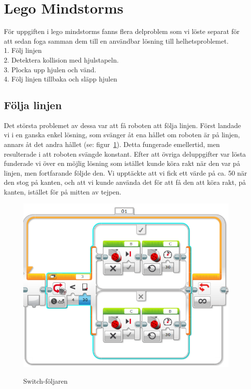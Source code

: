 \documentclass[12pt,a4paper]{article}
\begin{document}
\section{Lego Mindstorms}
För uppgiften i lego mindstorms fanns flera delproblem som vi löste separat för att sedan foga samman dem till en användbar lösning till helhetsproblemet. \\
1. Följ linjen \\
2. Detektera kollision med hjulstapeln. \\
3. Plocka upp hjulen och vänd. \\
4. Följ linjen tillbaka och släpp hjulen \\
\subsection{Följa linjen}
Det största problemet av dessa var att få roboten att följa linjen. Först landade vi i en ganska enkel lösning, som svänger åt ena hållet om roboten är på linjen, annars åt det andra hållet (se: figur~\ref{fig7:switchfollow}). Detta fungerade emellertid, men resulterade i att roboten svängde konstant. Efter att övriga deluppgifter var lösta funderade vi över en möjlig lösning som istället kunde köra rakt när den var på linjen, men fortfarande följde den. Vi upptäckte att vi fick ett värde på ca. 50 när den stog på kanten, och att vi kunde använda det för att få den att köra rakt, på kanten, istället för på mitten av tejpen. 
\begin{figure}[H]
	\caption{Switch-följaren}
	\centering
	\includegraphics[scale=0.8]{switchfollow}
	\label{fig7:switchfollow}
\end{figure} 
\end{document}
